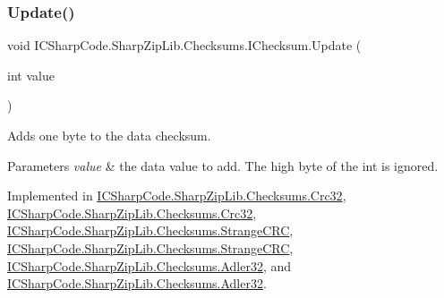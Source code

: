 \subsubsection{\texorpdfstring{Update()}{Update()}\hspace{0.1cm}{\footnotesize\ttfamily [1/6]}}
{\footnotesize\ttfamily void I\+C\+Sharp\+Code.\+Sharp\+Zip\+Lib.\+Checksums.\+I\+Checksum.\+Update (\begin{DoxyParamCaption}\item[{int}]{value }\end{DoxyParamCaption})}



Adds one byte to the data checksum. 


\begin{DoxyParams}{Parameters}
{\em value} & the data value to add. The high byte of the int is ignored. \\
\hline
\end{DoxyParams}


Implemented in \hyperlink{class_i_c_sharp_code_1_1_sharp_zip_lib_1_1_checksums_1_1_crc32_a7f5626219875b0291d1f54e5a7bdbeaa}{I\+C\+Sharp\+Code.\+Sharp\+Zip\+Lib.\+Checksums.\+Crc32}, \hyperlink{class_i_c_sharp_code_1_1_sharp_zip_lib_1_1_checksums_1_1_crc32_a7f5626219875b0291d1f54e5a7bdbeaa}{I\+C\+Sharp\+Code.\+Sharp\+Zip\+Lib.\+Checksums.\+Crc32}, \hyperlink{class_i_c_sharp_code_1_1_sharp_zip_lib_1_1_checksums_1_1_strange_c_r_c_a23b221cea3b706bd2e7c9fb8afb5786b}{I\+C\+Sharp\+Code.\+Sharp\+Zip\+Lib.\+Checksums.\+Strange\+C\+RC}, \hyperlink{class_i_c_sharp_code_1_1_sharp_zip_lib_1_1_checksums_1_1_strange_c_r_c_a23b221cea3b706bd2e7c9fb8afb5786b}{I\+C\+Sharp\+Code.\+Sharp\+Zip\+Lib.\+Checksums.\+Strange\+C\+RC}, \hyperlink{class_i_c_sharp_code_1_1_sharp_zip_lib_1_1_checksums_1_1_adler32_ae37b99f42678909be303136f2995b572}{I\+C\+Sharp\+Code.\+Sharp\+Zip\+Lib.\+Checksums.\+Adler32}, and \hyperlink{class_i_c_sharp_code_1_1_sharp_zip_lib_1_1_checksums_1_1_adler32_ae37b99f42678909be303136f2995b572}{I\+C\+Sharp\+Code.\+Sharp\+Zip\+Lib.\+Checksums.\+Adler32}.

\mbox{\label{interface_i_c_sharp_code_1_1_sharp_zip_lib_1_1_checksums_1_1_i_checksum_a060abf360d877d0d9cf503fa6d6873d0}} 
